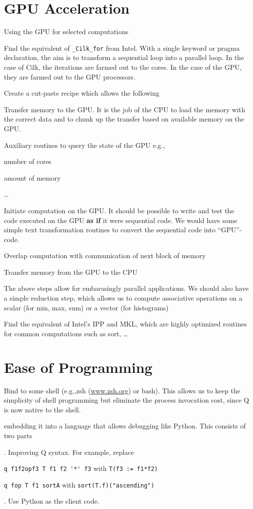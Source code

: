 \section{GPU Acceleration}
\label{GPU}
Using the GPU for selected computations 
\be
\item Find the equivalent of \verb+_Cilk_for+ from Intel. With a single
keyword or pragma declaration, the aim is to transform a sequential loop
into a parallel loop. In the case of Cilk, the iterations are farmed out
to the cores. In the case of the GPU, they are farmed out to the GPU
processors.
\item Create a cut-paste recipe which allows the following
\be
\item Transfer memory to the GPU. It is the job of the CPU to load the
memory with the correct data and to chunk up the transfer based on
available memory on the GPU.
\item Auxiliary routines to query the state of the GPU e.g., 
  \be
  \item number of cores
  \item amount of memory
  \item \ldots
  \ee
\item Initiate computation on the GPU. It should be possible to write
and test the code executed on the GPU {\bf as if} it were sequential
code. We would have some simple text transformation routines to convert
the sequential code into ``GPU''-code.
\item Overlap computation with communication of next block of memory
\item Transfer memory from the GPU to the CPU
\item The above steps allow for embarasingly parallel applications. We
should also have a simple reduction step, which allows us to compute
associative operations on a scalar (for min, max, sum) or a vector 
(for histograms)
\ee
\item Find the equivalent of Intel's IPP and MKL, which are highly
optimized routines for common computations such as sort, \ldots
\ee


\section{Ease of Programming}
\label{Programming_Ease}
\bi
\item Bind to some shell (e.g.,zsh (\url{www.zsh.org}) or bash). This
allows us to keep the simplicity of shell programming but eliminate the
process invocation cost, since Q is now native to the shell. 
\item embedding it into a language that allows debugging like Python.
This consists of two parts
\bd
\item [SYNTAX]. Improving Q syntax. For example, replace
\be 
\item \verb+q f1f2opf3 T f1 f2 '*' f3+ with 
\verb+T(f3 := f1*f2)+
\item 
\verb+q fop T f1 sortA+ with  \verb+sort(T.f)("ascending")+
\ee
\item [CLIENT]. Use Python as the client code. 

